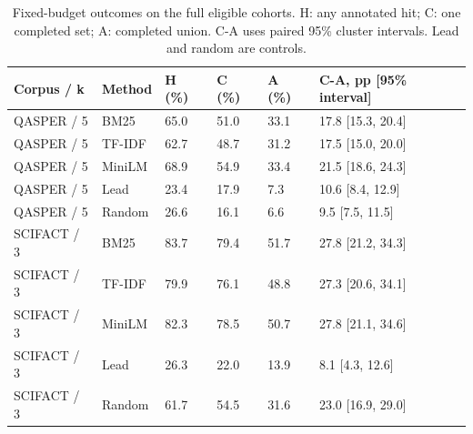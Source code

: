 \begin{table}[htbp]\centering\small\caption{Fixed-budget outcomes on the full eligible cohorts. H: any annotated hit; C: one completed set; A: completed union. C-A uses paired 95\% cluster intervals. Lead and random are controls.}
\begin{tabular}{p{65pt}p{42pt}p{30pt}p{30pt}p{30pt}p{163pt}}
\toprule
Corpus / k & Method & H (\%) & C (\%) & A (\%) & C-A, pp [95\% interval] \\
\midrule
QASPER / 5 & BM25 & 65.0 & 51.0 & 33.1 & 17.8 [15.3, 20.4] \\
QASPER / 5 & TF-IDF & 62.7 & 48.7 & 31.2 & 17.5 [15.0, 20.0] \\
QASPER / 5 & MiniLM & 68.9 & 54.9 & 33.4 & 21.5 [18.6, 24.3] \\
QASPER / 5 & Lead & 23.4 & 17.9 & 7.3 & 10.6 [8.4, 12.9] \\
QASPER / 5 & Random & 26.6 & 16.1 & 6.6 & 9.5 [7.5, 11.5] \\
SCIFACT / 3 & BM25 & 83.7 & 79.4 & 51.7 & 27.8 [21.2, 34.3] \\
SCIFACT / 3 & TF-IDF & 79.9 & 76.1 & 48.8 & 27.3 [20.6, 34.1] \\
SCIFACT / 3 & MiniLM & 82.3 & 78.5 & 50.7 & 27.8 [21.1, 34.6] \\
SCIFACT / 3 & Lead & 26.3 & 22.0 & 13.9 & 8.1 [4.3, 12.6] \\
SCIFACT / 3 & Random & 61.7 & 54.5 & 31.6 & 23.0 [16.9, 29.0] \\
\bottomrule\end{tabular}\end{table}
